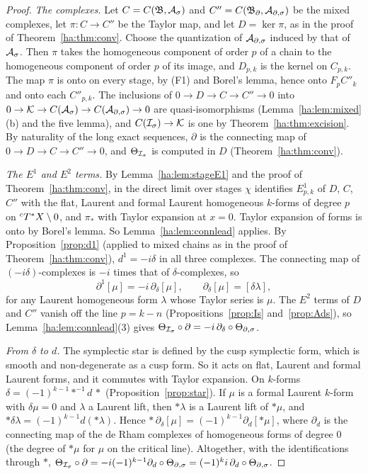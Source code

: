 \begin{proof}
\emph{The complexes.} Let \(C=C(\mathfrak B,\mathcal A_\sigma)\) and \(C''=C(\mathfrak
B_\partial,\mathcal A_{\partial,\sigma})\) be the mixed complexes, let \(\pi:C\to C''\) be the
Taylor map, and let \(D=\ker\pi\), as in the proof of
Theorem~\ref{ha:thm:conv}. Choose the quantization of \(\mathcal A_{\partial,\sigma}\) induced by
that of \(\mathcal A_\sigma\). Then \(\pi\) takes the homogeneous component of order
\(p\) of a chain to the homogeneous component of order \(p\) of its image,
and \(D_{p,k}\) is the kernel on \(C_{p,k}\). The map \(\pi\) is onto on
every stage, by (F1) and Borel's lemma, hence onto \(F_pC''_k\) and onto
each \(C''_{p,k}\). The inclusions of \(0\to D\to C\to C''\to0\) into
\(0\to\mathcal K\to C(\mathcal A_\sigma)\to C(\mathcal A_{\partial,\sigma})\to0\) are quasi-isomorphisms
(Lemma~\ref{ha:lem:mixed}(b) and the five lemma), and \(C(\mathcal I_\sigma)\to\mathcal K\) is
one by Theorem~\ref{ha:thm:excision}. By naturality of the long exact
sequences, \(\partial\) is the connecting map of \(0\to D\to C\to
C''\to0\), and \(\Theta_{\mathcal I_\sigma}\) is computed in \(D\)
(Theorem~\ref{ha:thm:conv}).

\emph{The \(E^1\) and \(E^2\) terms.} By Lemma~\ref{ha:lem:stageE1} and
the proof of Theorem~\ref{ha:thm:conv}, in the direct limit over stages
\(\chi\) identifies \(E^1_{p,k}\) of \(D\), \(C\), \(C''\) with the flat,
Laurent and formal Laurent homogeneous \(k\)-forms of degree \(p\) on
\({}^cT^*X\setminus0\), and \(\pi_*\) with Taylor expansion at \(x=0\). Taylor
expansion of forms is onto by Borel's lemma. So
Lemma~\ref{ha:lem:connlead} applies. By Proposition~\ref{prop:d1}
(applied to mixed chains as in the proof of Theorem~\ref{ha:thm:conv}),
\(d^1=-i\delta\) in all three complexes. The connecting map of
\((-i\delta)\)-complexes is \(-i\) times that of \(\delta\)-complexes, so
\[
 \partial^1[\mu]=-i\,\partial_\delta[\mu],\qquad
 \partial_\delta[\mu]=[\delta\lambda],
\]
for any Laurent homogeneous form \(\lambda\) whose Taylor series is
\(\mu\). The \(E^2\) terms of \(D\) and \(C''\) vanish off the line
\(p=k-n\) (Propositions~\ref{prop:Is} and~\ref{prop:Ads}), so
Lemma~\ref{ha:lem:connlead}(3) gives \(\Theta_{\mathcal I_\sigma}\circ\partial=
-i\,\partial_\delta\circ\Theta_{\partial,\sigma}\).

\emph{From \(\delta\) to \(d\).} The symplectic star is defined by the
cusp symplectic form, which is smooth and non-degenerate as a cusp form.
So it acts on flat, Laurent and formal Laurent forms, and it commutes with
Taylor expansion. On \(k\)-forms \(\delta=(-1)^{k-1}*^{-1}d\,*\)
(Proposition~\ref{prop:star}). If \(\mu\) is a formal Laurent \(k\)-form
with \(\delta\mu=0\) and \(\lambda\) a Laurent lift, then \(*\lambda\) is a
Laurent lift of \(*\mu\), and \(*\delta\lambda=(-1)^{k-1}d(*\lambda)\).
Hence \(*\,\partial_\delta[\mu]=(-1)^{k-1}\partial_d[*\mu]\), where
\(\partial_d\) is the connecting map of the de Rham complexes of
homogeneous forms of degree \(0\) (the degree of \(*\mu\) for \(\mu\) on
the critical line). Altogether, with the identifications through \(*\),
\(\Theta_{\mathcal I_\sigma}\circ\partial=-i(-1)^{k-1}\partial_d\circ
\Theta_{\partial,\sigma}=(-1)^ki\,\partial_d\circ\Theta_{\partial,\sigma}\).


\end{proof}
